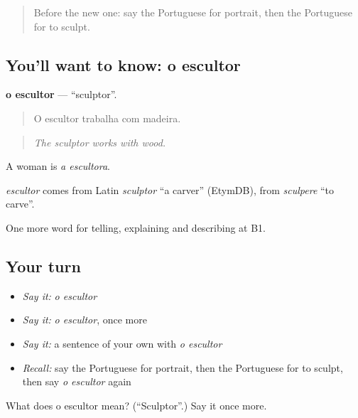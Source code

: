 \label{lesson:PT-C522-escultor}



\begin{quote}
Before the new one: say the Portuguese for portrait, then the Portuguese for to sculpt.
\end{quote}

\subsection*{You'll want to know: o escultor}
\textbf{o escultor} — \textquotedblleft{}sculptor\textquotedblright{}.

\begin{quote}
O escultor trabalha com madeira.
\end{quote}

\begin{quote}
\emph{The sculptor works with wood.}
\end{quote}

A woman is \emph{a escultora}.

\begin{cousinweb}
\emph{escultor} comes from Latin \emph{sculptor} \textquotedblleft{}a carver\textquotedblright{} (EtymDB), from \emph{sculpere} \textquotedblleft{}to carve\textquotedblright{}.
\end{cousinweb}

\begin{grammarlens}[title={What you've built}]
One more word for telling, explaining and describing at B1.
\end{grammarlens}

\subsection*{Your turn}
\begin{itemize}
\raggedright
  \item \emph{Say it:} \emph{o escultor}
  \item \emph{Say it:} \emph{o escultor}, once more
  \item \emph{Say it:} a sentence of your own with \emph{o escultor}
  \item \emph{Recall:} say the Portuguese for portrait, then the Portuguese for to sculpt, then say \emph{o escultor} again
\end{itemize}

\begin{tcolorbox}[breakable,colback=teal!4,colframe=teal!35!black,title={Before you move on}]
What does o escultor mean? (\textquotedblleft{}Sculptor\textquotedblright{}.) Say it once more.
\end{tcolorbox}
